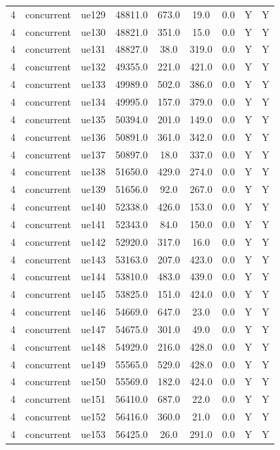 \begin{table}[ht]
\begin{tabular}{|c|c|c|c|c|c|c|c|c|}
4 & concurrent & ue129 & 48811.0 & 673.0 & 19.0 & 0.0 & Y & Y \\
4 & concurrent & ue130 & 48821.0 & 351.0 & 15.0 & 0.0 & Y & Y \\
4 & concurrent & ue131 & 48827.0 & 38.0 & 319.0 & 0.0 & Y & Y \\
4 & concurrent & ue132 & 49355.0 & 221.0 & 421.0 & 0.0 & Y & Y \\
4 & concurrent & ue133 & 49989.0 & 502.0 & 386.0 & 0.0 & Y & Y \\
4 & concurrent & ue134 & 49995.0 & 157.0 & 379.0 & 0.0 & Y & Y \\
4 & concurrent & ue135 & 50394.0 & 201.0 & 149.0 & 0.0 & Y & Y \\
4 & concurrent & ue136 & 50891.0 & 361.0 & 342.0 & 0.0 & Y & Y \\
4 & concurrent & ue137 & 50897.0 & 18.0 & 337.0 & 0.0 & Y & Y \\
4 & concurrent & ue138 & 51650.0 & 429.0 & 274.0 & 0.0 & Y & Y \\
4 & concurrent & ue139 & 51656.0 & 92.0 & 267.0 & 0.0 & Y & Y \\
4 & concurrent & ue140 & 52338.0 & 426.0 & 153.0 & 0.0 & Y & Y \\
4 & concurrent & ue141 & 52343.0 & 84.0 & 150.0 & 0.0 & Y & Y \\
4 & concurrent & ue142 & 52920.0 & 317.0 & 16.0 & 0.0 & Y & Y \\
4 & concurrent & ue143 & 53163.0 & 207.0 & 423.0 & 0.0 & Y & Y \\
4 & concurrent & ue144 & 53810.0 & 483.0 & 439.0 & 0.0 & Y & Y \\
4 & concurrent & ue145 & 53825.0 & 151.0 & 424.0 & 0.0 & Y & Y \\
4 & concurrent & ue146 & 54669.0 & 647.0 & 23.0 & 0.0 & Y & Y \\
4 & concurrent & ue147 & 54675.0 & 301.0 & 49.0 & 0.0 & Y & Y \\
4 & concurrent & ue148 & 54929.0 & 216.0 & 428.0 & 0.0 & Y & Y \\
4 & concurrent & ue149 & 55565.0 & 529.0 & 428.0 & 0.0 & Y & Y \\
4 & concurrent & ue150 & 55569.0 & 182.0 & 424.0 & 0.0 & Y & Y \\
4 & concurrent & ue151 & 56410.0 & 687.0 & 22.0 & 0.0 & Y & Y \\
4 & concurrent & ue152 & 56416.0 & 360.0 & 21.0 & 0.0 & Y & Y \\
4 & concurrent & ue153 & 56425.0 & 26.0 & 291.0 & 0.0 & Y & Y \\

\end{tabular}
\end{table}

